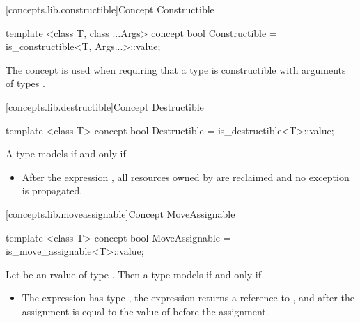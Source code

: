 \begin{addedblock}
[concepts.lib.constructible]{Concept Constructible}

%
\begin{itemdecl}
template <class T, class ...Args>
concept bool Constructible =
  is_constructible<T, Args...>::value;
\end{itemdecl}

\begin{itemdescr}
\pnum
The  concept is used when requiring that a type  is
constructible with arguments of types .
\end{itemdescr}

[concepts.lib.destructible]{Concept Destructible}

%
\begin{itemdecl}
template <class T>
concept bool Destructible =
  is_destructible<T>::value;
\end{itemdecl}

\begin{itemdescr}
\pnum
A type  models  if and only if

\begin{itemize}
\item After the expression , all resources owned by  are
reclaimed and no exception is propagated.
\end{itemize}
\end{itemdescr}

[concepts.lib.moveassignable]{Concept MoveAssignable}

%
\begin{itemdecl}
template <class T>
concept bool MoveAssignable =
  is_move_assignable<T>::value;
\end{itemdecl}

\begin{itemdescr}
\pnum
Let  be an rvalue of type . Then a type  models
 if and only if

\begin{itemize}
\item The expression  has type , the expression returns
a reference to , and after the assignment  is equal to the value
of  before the assignment.
\end{itemize}


\end{itemdescr}
\end{addedblock}
